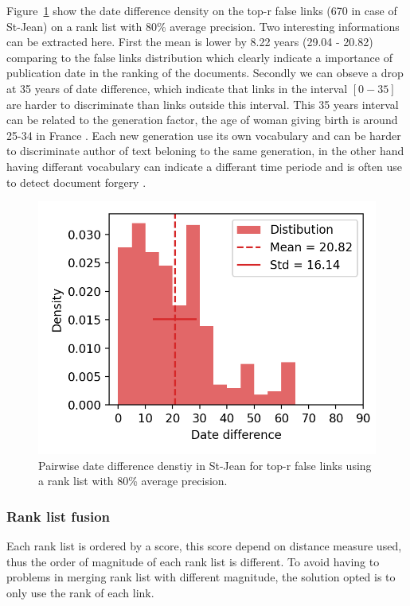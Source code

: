 Figure~\ref{fig:dates_differences_r_false} show the date difference density on the top-r false links (670 in case of St-Jean) on a rank list with 80\% average precision.
Two interesting informations can be extracted here.
First the mean is lower by 8.22 years (29.04 - 20.82) comparing to the false links distribution which clearly indicate a importance of publication date in the ranking of the documents.
Secondly we can obseve a drop at 35 years of date difference, which indicate that links in the interval $\left[0-35\right]$ are harder to discriminate than links outside this interval.
This 35 years interval can be related to the generation factor, the age of woman giving birth is around 25-34 in France \cite{generations}.
Each new generation use its own vocabulary and can be harder to discriminate author of text beloning to the same generation, in the other hand having differant vocabulary can indicate a differant time periode and is often use to detect document forgery \cite{savoy_stylo}.

\begin{figure}
  \includegraphics[width=\linewidth]{img/dates_differences_r_false.png}
  \caption{Pairwise date difference denstiy in St-Jean for top-r false links using a rank list with 80\% average precision.}
  \label{fig:dates_differences_r_false}
\end{figure}

\subsubsection{Rank list fusion}

Each rank list is ordered by a score, this score depend on distance measure used, thus the order of magnitude of each rank list is different.
To avoid having to problems in merging rank list with different magnitude, the solution opted is to only use the rank of each link.

